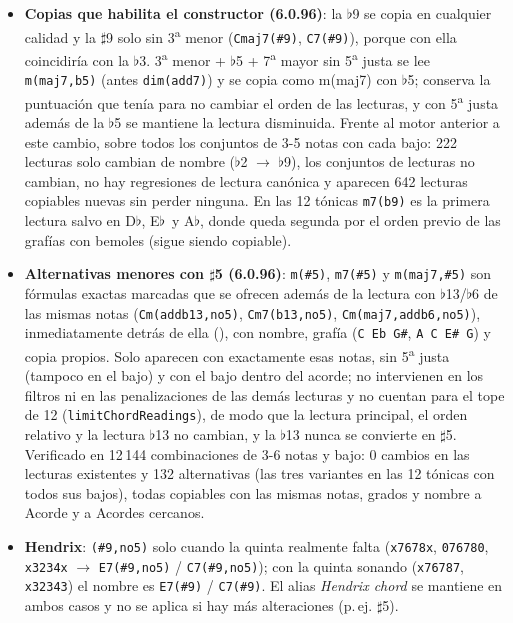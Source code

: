 \documentclass[a4paper,11pt,oneside]{report}
\newcommand{\flt}{\ensuremath{\flat}}
\newcommand{\shp}{\ensuremath{\sharp}}
\begin{document}
\begin{itemize}
\item \textbf{Copias que habilita el constructor (6.0.96)}: la \flt9 se copia en cualquier calidad y la \shp9 solo sin 3\textsuperscript{a} menor (\lstinline!Cmaj7(#9)!, \lstinline!C7(#9)!), porque con ella coincidiría con la \flt3. 3\textsuperscript{a} menor + \flt5 + 7\textsuperscript{a} mayor sin 5\textsuperscript{a} justa se lee \lstinline!m(maj7,b5)! (antes \lstinline!dim(add7)!) y se copia como m(maj7) con \flt5; conserva la puntuación que tenía para no cambiar el orden de las lecturas, y con 5\textsuperscript{a} justa además de la \flt5 se mantiene la lectura disminuida. Frente al motor anterior a este cambio, sobre todos los conjuntos de 3-5 notas con cada bajo: 222 lecturas solo cambian de nombre (\flt2 $\to$ \flt9), los conjuntos de lecturas no cambian, no hay regresiones de lectura canónica y aparecen 642 lecturas copiables nuevas sin perder ninguna. En las 12 tónicas \lstinline!m7(b9)! es la primera lectura salvo en D\flt, E\flt\ y A\flt, donde queda segunda por el orden previo de las grafías con bemoles (sigue siendo copiable).
\item \textbf{Alternativas menores con \shp5 (6.0.96)}: \lstinline!m(#5)!, \lstinline!m7(#5)! y \lstinline!m(maj7,#5)! son fórmulas exactas marcadas \texttt{} que se ofrecen además de la lectura con \flt13/\flt6 de las mismas notas (\lstinline!Cm(addb13,no5)!, \lstinline!Cm7(b13,no5)!, \lstinline!Cm(maj7,addb6,no5)!), inmediatamente detrás de ella (\texttt{}), con nombre, grafía (\lstinline!C Eb G#!, \lstinline!A C E# G!) y copia propios. Solo aparecen con exactamente esas notas, sin 5\textsuperscript{a} justa (tampoco en el bajo) y con el bajo dentro del acorde; no intervienen en los filtros ni en las penalizaciones de las demás lecturas y no cuentan para el tope de 12 (\lstinline!limitChordReadings!), de modo que la lectura principal, el orden relativo y la lectura \flt13 no cambian, y la \flt13 nunca se convierte en \shp5. Verificado en 12\,144 combinaciones de 3-6 notas y bajo: 0 cambios en las lecturas existentes y 132 alternativas (las tres variantes en las 12 tónicas con todos sus bajos), todas copiables con las mismas notas, grados y nombre a Acorde y a Acordes cercanos.
\item \textbf{Hendrix}: \lstinline!(#9,no5)! solo cuando la quinta realmente falta (\lstinline!x7678x!, \lstinline!076780!, \lstinline!x3234x! $\to$ \lstinline!E7(#9,no5)! / \lstinline!C7(#9,no5)!); con la quinta sonando (\lstinline!x76787!, \lstinline!x32343!) el nombre es \lstinline!E7(#9)! / \lstinline!C7(#9)!. El alias \textit{Hendrix chord} se mantiene en ambos casos y no se aplica si hay más alteraciones (p.\,ej. \shp5).

\end{itemize}
\end{document}
